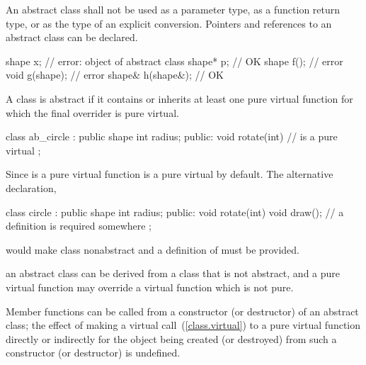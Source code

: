 \pnum
{}%
An abstract class shall not be used as a parameter type, as a function
return type, or as the type of an explicit conversion. Pointers and
references to an abstract class can be declared.
\enterexample
\begin{codeblock}
shape x;                        // error: object of abstract class
shape* p;                       // OK
shape f();                      // error
void g(shape);                  // error
shape& h(shape&);               // OK
\end{codeblock}
\exitexampleb

\pnum
{}%
A class is abstract if it contains or inherits at least one pure virtual
function for which the final overrider is pure virtual.
\enterexample
\begin{codeblock}
class ab_circle : public shape {
    int radius;
public:
    void rotate(int) {}
    //  is a pure virtual
};
\end{codeblock}

Since  is a pure virtual function
 is a pure virtual by default. The alternative
declaration,
\begin{codeblock}
class circle : public shape {
    int radius;
public:
    void rotate(int) {}
    void draw();                // a definition is required somewhere
};
\end{codeblock}
would make class  nonabstract and a definition of
 must be provided.
\exitexample

\pnum
\enternote
an abstract class can be derived from a class that is not abstract, and
a pure virtual function may override a virtual function which is not
pure.
\exitnote

\pnum
{}%
Member functions can be called from a constructor (or destructor) of an
abstract class;
%
the effect of making a virtual call~(\ref{class.virtual}) to a pure
virtual function directly or indirectly for the object being created (or
destroyed) from such a constructor (or destructor) is undefined.%
